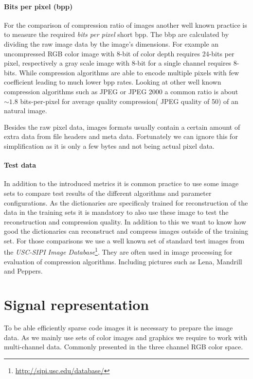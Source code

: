 \paragraph{Bits per pixel (bpp)} 
For the comparison of compression ratio of images another well known practice is
to measure the required \emph{bits per pixel} short bpp. The bbp are calculated
by dividing the raw image data by the image's dimensions. For example an
uncompressed RGB color image with 8-bit of color depth requires 24-bits per
pixel, respectively a gray scale image with 8-bit for a single channel requires
8-bits. While compression algorithms are able to encode multiple pixels with few
coefficient leading to much lower bpp rates.
Looking at other well known compression algorithms such as JPEG or
JPEG 2000 a common ratio is about $\sim1.8$ bits-per-pixel for average
quality compression( JPEG quality of 50) of an natural image. 

Besides the raw pixel data, images formats usually contain a certain amount
of extra data from file headers and meta data. Fortunately we can ignore this
for simplification as it is only a few bytes and not being actual pixel data.

\paragraph{Test data}
In addition to the introduced metrics it is common practice to use some image
sets to compare test results of the different algorithms and parameter
configurations. As the dictionaries are specificaly trained for
reconstruction of the data in the training sets it is mandatory to also use
these image to test the reconstruction and compression quality.
In addition to this we want to know how good the dictionaries can reconstruct
and compress images outside of the training set. For those comparisons we use a
well known set of standard test images from the \emph{USC-SIPI Image
Database}\footnote{\url{http://sipi.usc.edu/database/}}. They are often
used in image processing for evaluation of compression algorithms. 
Including pictures such as Lena, Mandrill and Peppers.



\section{Signal representation}
\label{sec:signal_representation}
To be able efficiently sparse code images it is necessary to prepare the
image data. As we mainly use sets of color images and graphics we require
to work with multi-channel data. Commonly presented in the three channel RGB
color space. 

